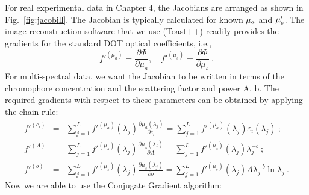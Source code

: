 For real experimental data in Chapter 4, the Jacobians are arranged as shown in Fig.~\ref{fig:jacobill}. The Jacobian is typically calculated for known $\mu_a$ and $\mu_s^{\prime}$. The image reconstruction software that we use (Toast++) readily provides the gradients for the standard DOT optical coefficients, i.e., 
\begin{equation}
f'^{(\mu_a)} = \frac{\partial \Phi}{\partial \mu_a}, \quad f'^{(\mu_s)} = \frac{\partial \Phi}{\partial \mu_s} \ .
\end{equation}
For multi-spectral data, we want the Jacobian to be written in terms of the chromophore concentration and the scattering factor and power A, b. The required gradients with respect to these parameters can be obtained by applying the chain rule:
\begin{eqnarray}
f'^{(c_i)} &=& \sum_{j=1}^L f'^{(\mu_a)}(\lambda_j) \frac{\partial \mu_a(\lambda_j)}{\partial c_i} = \sum_{j=1}^L f'^{(\mu_a)}(\lambda_j) \varepsilon_i(\lambda_j) \ ; \\
f'^{(A)} &=& \sum_{j=1}^L f'^{(\mu_s)}(\lambda_j) \frac{\partial \mu_s(\lambda_j)}{\partial A} = \sum_{j=1}^L f'^{(\mu_s)}(\lambda_j) \lambda_j^{-b} \ ; \\
f'^{(b)} &=& \sum_{j=1}^L f'^{(\mu_s)}(\lambda_j) \frac{\partial \mu_s(\lambda_j)}{\partial b} = \sum_{j=1}^L f'^{(\mu_s)}(\lambda_j) A \lambda_j^{-b} \ln{\lambda_j} \ .
\end{eqnarray}
%
Now we are able to use the Conjugate Gradient algorithm:
